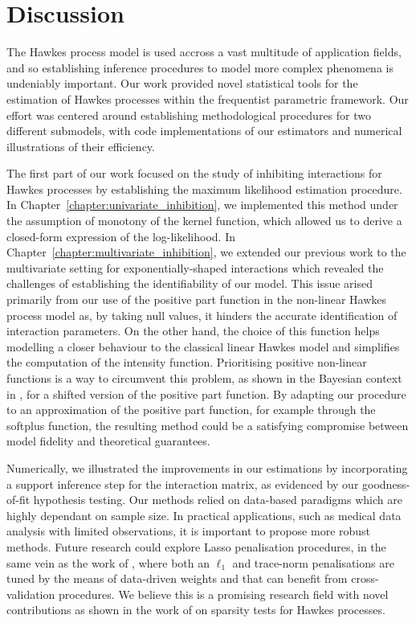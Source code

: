 
\chapter{Discussion}

The Hawkes process model is used accross a vast multitude of application fields, and so establishing inference procedures to model more complex phenomena is undeniably important. 
Our work provided novel statistical tools for the estimation of Hawkes processes within the frequentist parametric framework.
Our effort was centered around establishing methodological procedures for two different submodels, with code implementations of our estimators and numerical illustrations of their efficiency. 

\vspace{5mm}


The first part of our work focused on the study of inhibiting interactions for Hawkes processes by establishing the maximum likelihood estimation procedure.
In Chapter~\ref{chapter:univariate_inhibition}, we implemented this method under the assumption of monotony of the kernel function, which allowed us to derive a closed-form expression of the log-likelihood. 
In Chapter~\ref{chapter:multivariate_inhibition}, we extended our previous work to the multivariate setting for exponentially-shaped interactions which revealed the challenges of establishing the identifiability of our model.
This issue arised primarily from our use of the positive part function in the non-linear Hawkes process model as, by taking null values, it hinders the accurate identification of interaction parameters.
On the other hand, the choice of this function helps modelling a closer behaviour to the classical linear Hawkes model and simplifies the computation of the intensity function.
Prioritising positive non-linear functions is a way to circumvent this problem, as shown in the Bayesian context in \textcite{Sulem2024}, for a shifted version of the positive part function.
By adapting our procedure to an approximation of the positive part function, for example through the softplus function, the resulting method could be a satisfying compromise between model fidelity and theoretical guarantees. 

Numerically, we illustrated the improvements in our estimations by incorporating a support inference step for the interaction matrix, as evidenced by our goodness-of-fit hypothesis testing.
Our methods relied on data-based paradigms which are highly dependant on sample size.
In practical applications, such as medical data analysis with limited observations, it is important to propose more robust methods. 
Future research could explore Lasso penalisation procedures, in the same vein as the work of \textcite{Bacry2020}, where both an $\ell_1$ and trace-norm penalisations are tuned by the means of data-driven weights and that can benefit from cross-validation procedures.
We believe this is a promising research field with novel contributions as shown in the work of \textcite{Lotz2024} on sparsity tests for Hawkes processes.


